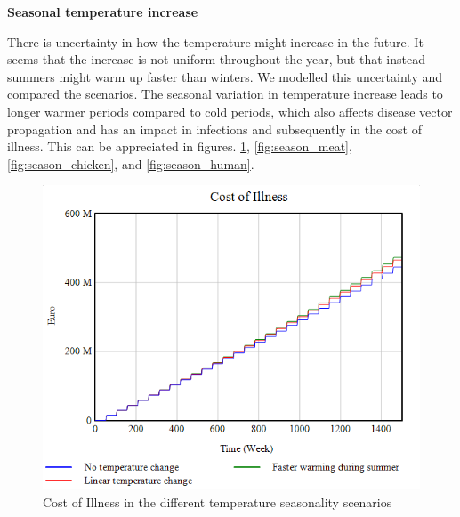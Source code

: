 \textbf{Seasonal temperature increase}

There is uncertainty in how the temperature might increase in the future. It seems that the increase is not uniform throughout the year, but that instead summers might warm up faster than winters. We modelled this uncertainty and compared the scenarios. The seasonal variation in temperature increase leads to longer warmer periods compared to cold periods, which also affects disease vector propagation and has an impact in infections and subsequently in the cost of illness. This can be appreciated in figures. \ref{fig:season_coi}, \ref{fig:season_meat}, \ref{fig:season_chicken}, and \ref{fig:season_human}.

\begin{figure}[h!]
    \centering
    \begin{minipage}{0.45\textwidth}
        \centering
        \includegraphics[width=1\textwidth]{images/sensitivity/Seasonal temperature COI.png} %
        \caption{Cost of Illness in the different temperature seasonality scenarios}
        \label{fig:season_coi}
    \end{minipage}\hfill
    \begin{minipage}{0.45\textwidth}
        \centering

\end{minipage}
\end{figure}

